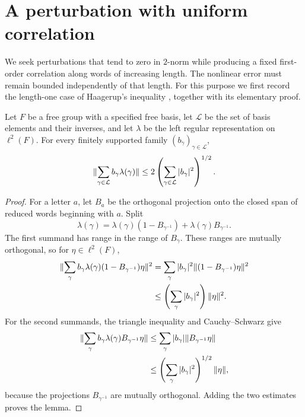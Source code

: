 \section{A perturbation with uniform correlation}
\label{sec:perturbation}

We seek perturbations that tend to zero in $2$-norm while producing
a fixed first-order correlation along words of increasing length.
The nonlinear error must remain bounded independently of that length.
For this purpose we first record the length-one case of Haagerup's
inequality \cite[Lemma~1.4]{Haagerup1979}, together with its elementary
proof.

\begin{lemma}\label{lem:length-one-convolution}
Let $F$ be a free group with a specified free basis, let $\mathcal L$
be the set of basis elements and their inverses, and let $\lambda$
be the left regular representation on $\ell^2(F)$.
For every finitely supported family $(b_\gamma)_{\gamma\in\mathcal L}$,
\[
  \lVert \sum_{\gamma\in\mathcal L}b_\gamma\lambda(\gamma)\rVert
  \le 2\left(\sum_{\gamma\in\mathcal L}|b_\gamma|^2\right)^{1/2}.
\]
\end{lemma}

\begin{proof}
For a letter $a$, let $B_a$ be the orthogonal projection onto the
closed span of reduced words beginning with $a$.  Split
\[
  \lambda(\gamma)
  =\lambda(\gamma)(1-B_{\gamma^{-1}})
   +\lambda(\gamma)B_{\gamma^{-1}}.
\]
The first summand has range in the range of $B_\gamma$.
These ranges are mutually orthogonal, so for $\eta\in\ell^2(F)$,
\begin{align*}
  \lVert \sum_\gamma b_\gamma\lambda(\gamma)
                (1-B_{\gamma^{-1}})\eta\rVert^2
  &=\sum_\gamma |b_\gamma|^2
                 \lVert (1-B_{\gamma^{-1}})\eta\rVert^2\\
  &\le\left(\sum_\gamma |b_\gamma|^2\right)\lVert \eta\rVert^2.
\end{align*}
For the second summands, the triangle inequality and
Cauchy--Schwarz give
\begin{align*}
  \lVert \sum_\gamma b_\gamma\lambda(\gamma)
                    B_{\gamma^{-1}}\eta\rVert
  &\le\sum_\gamma |b_\gamma|\lVert B_{\gamma^{-1}}\eta\rVert\\
  &\le\left(\sum_\gamma|b_\gamma|^2\right)^{1/2}\lVert \eta\rVert,
\end{align*}
because the projections $B_{\gamma^{-1}}$ are mutually orthogonal.
Adding the two estimates proves the lemma.
\end{proof}


